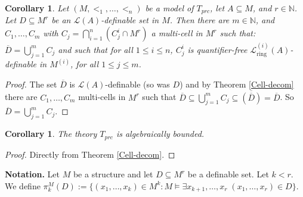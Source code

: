 \documentclass[12pt]{article}
\newtheorem{cor}[thm]{Corollary}
\theoremstyle{definition}
\theoremstyle{mystyle}
\theoremstyle{remark}
\newcommand{\LC}{\mathcal{L}}
\newcommand{\Li}{\mathcal{L}^{(i)}_{\text{ring}}}
\newcommand{\clos}[2]{#1^{(#2)}}
\begin{document}
\begin{cor}\label{multiclosure}
Let $(M, <_1, \ldots, <_n)$ be a  model of $T_{prc}$, let $A
\subseteq M$, and $r \in \mathbb{N}$. Let $D \subseteq M^r$ be an
$\LC(A)$-definable set in $M$. Then there are $m \in \mathbb{N}$,
and $C_1, \ldots, C_m$ with $C_j= \displaystyle{\bigcap_{i=1}^n
(C^i_j\cap M^r)}$ a multi-cell in $M^r$ such that: $\overline{D} =
\displaystyle{\bigcup_{j=1}^m C_ j}$ and  such that for all $1
\leq i\leq n$, $C^i_j$ is quantifier-free $\Li(A)$-definable in
$\clos{M}{i}$, for all $1 \leq j \leq m$.
\end{cor}
\begin{proof}
The set $\overline{D}$ is $\LC(A)$-definable (so was $D$) and by Theorem
\ref{Cell-decom} there are $C_1, \ldots, C_m$ multi-cells in $M^r$
such that $\overline{D} \subseteq
\displaystyle{\bigcup_{j=1}^m}C_j \subseteq
\overline{(\overline{D})} = \overline{D}$. So $\overline{D}=
\displaystyle{\bigcup_{j=1}^m}C_j$.
\end{proof}




\begin{cor}\label{PRCAlgBound}
The theory $T_{prc}$ is algebraically bounded.
\end{cor}
\begin{proof}
Directly from Theorem \ref{Cell-decom}.
\end{proof}




\noindent \textbf{Notation.} Let $M$ be a structure and let $D
\subseteq M^r$ be a definable set. Let $k < r$. We define
$\pi_k^M(D):= \{(x_1, \ldots, x_k) \in M^k: M \models \exists
x_{k+1}, \ldots, x_{r} \;(x_{1}, \ldots, x_{r}) \in D \}$.
\end{document}
